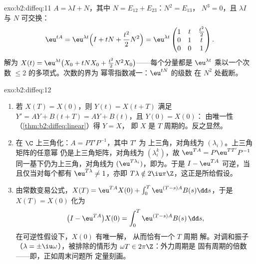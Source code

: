 \begin{solution}{exo:b2:diffeq:11}
$A = \lambda I + N$，其中 $N = E_{12} + E_{23}$：$N^2 = E_{13}$，
$N^3 = 0$，且 $\lambda I$ 与 $N$ 可交换：
\[
\eu^{tA} = \eu^{\lambda t}\Bigl(I + tN +
\frac{t^2}{2}N^2\Bigr)
= \eu^{\lambda t}\begin{pmatrix}
1 & t & \frac{t^2}{2}\\
0 & 1 & t\\
0 & 0 & 1
\end{pmatrix}.
\]
解为 $X(t) = \eu^{\lambda t}\bigl(X_0 + tNX_0 +
\frac{t^2}2N^2X_0\bigr)$——每个分量都是 $\eu^{\lambda
t}$ 乘以一个次数 $\leq 2$ 的多项式。次数的界为
幂零指数减一：$\eu^{tN}$ 的级数
在 $N^2$ 处截断。
\end{solution}

\begin{solution}{exo:b2:diffeq:12}
\begin{enumerate}
  \item 若 $X(T) = X(0)$，则 $Y(t) = X(t + T)$ 满足 $Y' =
        AY + B(t + T) = AY + B(t)$，且 $Y(0) = X(0)$：
        由唯一性（\cref{thm:b2:diffeq:linear}）得 $Y = X$，
        即 $X$ 是 $T$ 周期的。反之显然。
  \item 在 $\C$ 上三角化：$A = PT'P^{-1}$，其中 $T'$ 为
        上三角，对角线为 $(\lambda_i)$。上三角矩阵的任意幂
        仍是上三角矩阵，对角线为
        $(\lambda_i^k)$，故 $\eu^{TA} = P\eu^{TT'}P^{-1}$
        同一基下仍为上三角，对角线为
        $(\eu^{T\lambda_i})$，即为。于是
        $I - \eu^{TA}$ 可逆，当且仅当对每个都有 $\eu^{T\lambda} \neq
        1$，亦即 $T\lambda \notin
        2\iu\pi\Z$，这正是所给假设。
  \item 由常数变易公式，$X(T) = \eu^{TA}X(0) +
        \int_0^T\eu^{(T-s)A}B(s)\dd s$，于是 $X(T) = X(0)$ 化为
        \[
        \bigl(I - \eu^{TA}\bigr)X(0) =
        \int_0^{T}\eu^{(T-s)A}B(s)\,\dd s ,
        \]
        在可逆性假设下，$X(0)$ 有唯一解，
        从而恰有一个 $T$ 周期
        解。对调和振子（$\lambda =
        \pm\iu\omega$），被排除的情形为 $\omega T \in
        2\pi\Z$：外力周期是
        固有周期的倍数——即，正如周末问题所
        定量刻画。
\end{enumerate}
\end{solution}

